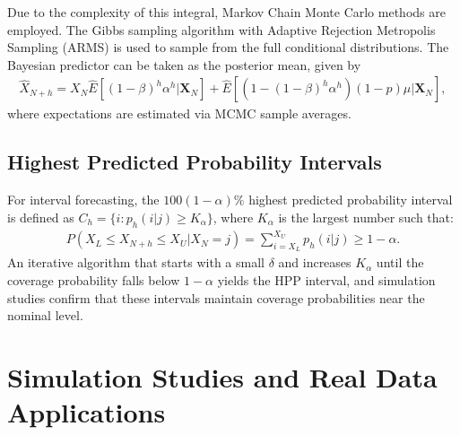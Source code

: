\documentclass[twoside]{article}
\begin{document}
Due to the complexity of this integral, Markov Chain Monte Carlo methods are employed. The Gibbs sampling algorithm with Adaptive Rejection Metropolis Sampling (ARMS) is used to sample from the full conditional distributions. The Bayesian predictor can be taken as the posterior mean, given by
\begin{eqnarray*}
\hat{X}_{N+h} = X_N \hat{E}[(1-\beta)^h\alpha^h|\mathbf{X}_N] + \hat{E}[(1-(1-\beta)^h\alpha^h)(1-p)\mu|\mathbf{X}_N],
\end{eqnarray*}
where expectations are estimated via MCMC sample averages.

\subsection{Highest Predicted Probability Intervals}
For interval forecasting, the $100(1-\alpha)\%$ highest predicted probability interval is defined as $C_h = \{i: p_h(i|j) \geq K_\alpha\}$, where $K_\alpha$ is the largest number such that:
\begin{eqnarray*}
P(X_L \leq X_{N+h} \leq X_U | X_N = j) = \sum_{i=X_L}^{X_U} p_h(i|j) \geq 1-\alpha.
\end{eqnarray*}
An iterative algorithm that starts with a small $\delta$ and increases $K_\alpha$ until the coverage probability falls below $1-\alpha$ yields the HPP interval, and simulation studies confirm that these intervals maintain coverage probabilities near the nominal level.

\section{Simulation Studies and Real Data Applications}
\end{document}
